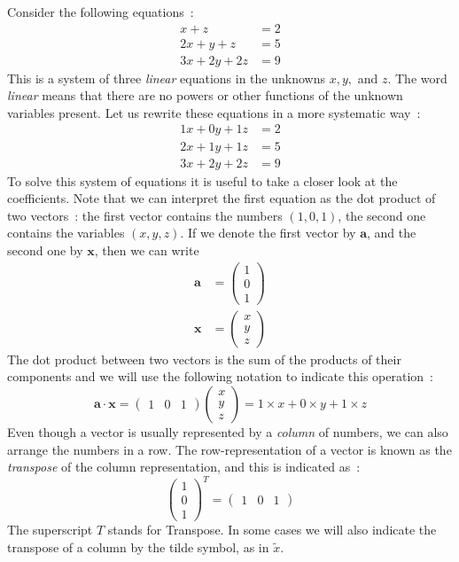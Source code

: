 Consider the following equations~:
\begin{align}
x+z&=2\nonumber\\
2x+y+z&=5\\
3x+2y+2z&=9\nonumber
\end{align}
This is a system of three \textit{linear} equations in the unknowns $x,y,$ and $z$.  The word \textit{linear} means that
there are no powers or other functions of the unknown variables present. 
Let us rewrite these equations in a more systematic way~:
\begin{align}
1x+0y+1z&=2\nonumber\\
2x+1y+1z&=5\\
3x+2y+2z&=9\nonumber
\end{align}
To solve this system of equations it is useful to take a closer look at the coefficients.  
Note that we can interpret the first equation as the dot product of two vectors~:
the first vector contains the numbers $(1,0,1)$, the second one contains the variables $(x,y,z)$.
If we denote the first vector by $\mathbf{a}$, and the second one by $\mathbf{x}$, then we can write
\begin{align}
\mathbf{a}&=\begin{pmatrix}1\\ 0\\ 1\end{pmatrix}\nonumber\\
\mathbf{x}&=\begin{pmatrix}x\\ y\\ z\end{pmatrix}\nonumber
\end{align}
The dot product between two vectors is the sum of the products of their components and we will use the 
following notation to indicate this operation~:
\begin{equation}
\mathbf{a}\cdot\mathbf{x}=\begin{pmatrix}1 &0 &1\end{pmatrix}\begin{pmatrix}x\\ y\\ z\end{pmatrix}=1\times x+0\times y+1\times z
\end{equation}
Even though a vector is usually represented by a \textit{column} of numbers, we can also arrange the numbers in a row.
The row-representation of a vector is known as the \textit{transpose} of the column representation, and this is indicated as~:
\begin{equation}
\begin{pmatrix}1\\ 0\\ 1\end{pmatrix}^{T}=\begin{pmatrix}1 &0 &1\end{pmatrix}
\end{equation}
The superscript $T$ stands for Transpose.  In some cases we will also indicate the transpose of a column by the tilde symbol,
as in $\tilde{x}$.

